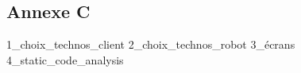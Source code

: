 \subsection{Annexe C} \label{sec:annexes_c}

{1_choix_technos_client}
{2_choix_technos_robot}
{3_écrans}
{4_static_code_analysis}